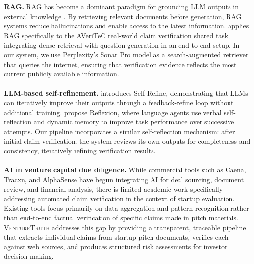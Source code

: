 \textbf{RAG.} RAG has become a dominant paradigm for grounding LLM outputs in external knowledge \citep{gao2023retrieval}. By retrieving relevant documents before generation, RAG systems reduce hallucinations and enable access to the latest information. \citet{adjali2024exploring} applies RAG specifically to the AVeriTeC real-world claim verification shared task, integrating dense retrieval with question generation in an end-to-end setup. In our system, we use Perplexity's Sonar Pro model as a search-augmented retriever that queries the internet, ensuring that verification evidence reflects the most current publicly available information.
\\
\\
\textbf{LLM-based self-refinement.} \citet{madaan2023selfrefine} introduces Self-Refine, demonstrating that LLMs can iteratively improve their outputs through a feedback-refine loop without additional training. \citet{shinn2023reflexion} propose Reflexion, where language agents use verbal self-reflection and dynamic memory to improve task performance over successive attempts. Our pipeline incorporates a similar self-reflection mechanism: after initial claim verification, the system reviews its own outputs for completeness and consistency, iteratively refining verification results.
\\
\\
\textbf{AI in venture capital due diligence.} While commercial tools such as Caena, Tracxn, and AlphaSense have begun integrating AI for deal sourcing, document review, and financial analysis, there is limited academic work specifically addressing automated claim verification in the context of startup evaluation. Existing tools focus primarily on data aggregation and pattern recognition rather than end-to-end factual verification of specific claims made in pitch materials. \textsc{VentureTruth} addresses this gap by providing a transparent, traceable pipeline that extracts individual claims from startup pitch documents, verifies each against web sources, and produces structured risk assessments for investor decision-making.

